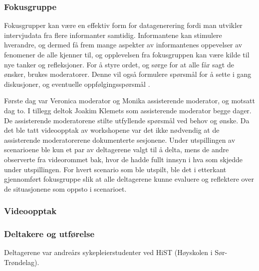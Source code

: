 \subsubsection{Fokusgruppe}
Fokusgrupper kan være en effektiv form for datagenerering fordi man utvikler intervjudata fra flere informanter samtidig. Informantene kan stimulere hverandre, og dermed få frem mange aspekter av informantenes oppevelser av fenomener de alle kjenner til, og opplevelsen fra fokusgruppen kan være kilde til nye tanker og refleksjoner. For å styre ordet, og sørge for at alle får sagt de ønsker, brukes moderatorer. Denne vil også formulere spørsmål for å sette i gang diskusjoner, og eventuelle oppfølgingsspørsmål \cite{Tjora}. 

\noindent
Første dag var Veronica moderator og Monika assisterende moderator, og motsatt dag to. I tillegg deltok Joakim Klemets som assisterende moderator begge dager. De assisterende moderatorene stilte utfyllende spørsmål ved behov og ønske. Da det ble tatt videoopptak av workshopene var det ikke nødvendig at de assisterende moderatorerene dokumenterte sesjonene. 
Under utspillingen av scenarioene ble kun et par av deltagerene valgt til å delta, mens de andre observerte fra videorommet bak, hvor de hadde fullt innsyn i hva som skjedde under utspillingen. For hvert scenario som ble utspilt, ble det i etterkant gjennomført fokusgruppe slik at alle deltagerene kunne evaluere og  reflektere over de situasjonene som oppsto i scenarioet.


\subsubsection{Videoopptak}
\subsubsection{Deltakere og utførelse}
Deltagerene var andreårs sykepleierstudenter ved HiST (Høyskolen i Sør-Trøndelag).



